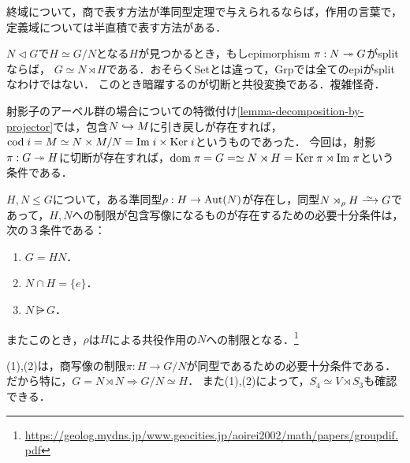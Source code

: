 \documentclass[uplatex,dvipdfmx]{jsreport}
\begin{document}
\begin{tcolorbox}[colframe=ForestGreen, colback=ForestGreen!10!white,breakable,colbacktitle=ForestGreen!40!white,coltitle=black,fonttitle=\bfseries\sffamily,
title=積と商の双対性が露わになっているのは偶然か？]
    終域について，商で表す方法が準同型定理で与えられるならば，作用の言葉で，
    定義域については半直積で表す方法がある．
    
    $N\triangleleft G$で$H\simeq G/N$となる$H$が見つかるとき，もしepimorphism $\pi:N\twoheadrightarrow G$がsplitならば，
    $G\simeq N\rtimes H$である．おそらくSetとは違って，Grpでは全てのepiがsplitなわけではない．
    このとき暗躍するのが切断と共役変換である．複雑怪奇．
    
    射影子のアーベル群の場合についての特徴付け\ref{lemma-decomposition-by-projector}では，包含$N\hookrightarrow M$に引き戻しが存在すれば，$\mathrm{cod}\; i=M\simeq N\times M/N=\mathrm{Im}\; i\times\mathrm{Ker}\; i$というものであった．
    今回は，射影$\pi:G\twoheadrightarrow H$に切断が存在すれば，$\mathrm{dom}\;\pi=G=\simeq N\rtimes H=\mathrm{Ker}\;\pi\rtimes\mathrm{Im}\;\pi$という条件である．
\end{tcolorbox}

\begin{theorem}
    $H,N\le G$について，ある準同型$\rho:H\to\mathrm{Aut}(N)$が存在し，同型$N\rtimes_\rho H\iso G$であって，$H,N$への制限が包含写像になるものが存在するための必要十分条件は，次の３条件である：
    \begin{enumerate}
        \item $G=HN$．
        \item $N\cap H=\{e\}$．
        \item $N\rsub G$．
    \end{enumerate}
    またこのとき，$\rho$は$H$による共役作用の$N$への制限となる．\footnote{\url{https://geolog.mydns.jp/www.geocities.jp/aoirei2002/math/papers/groupdif.pdf}}
\end{theorem}
\begin{remarks}\label{exp-semiproduct-decomposition}
    (1),(2)は，商写像の制限$\pi:H\to G/N$が同型であるための必要十分条件である．だから特に，$G=N\rtimes N\Rightarrow G/N\simeq H$．
    また(1),(2)によって，$S_4\simeq V\rtimes S_3$も確認できる．
\end{remarks}
\end{document}
